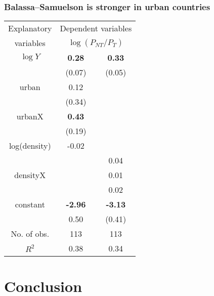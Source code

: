 \documentclass[handout,compress,mathserif]{beamer}
\newcounter{perc}
\newcounter{percek}
\begin{document}
\begin{frame}\frametitle{Balassa--Samuelson is stronger in urban countries}
\begin{tabular}{c|cc}
  \hline\hline
  Explanatory & \multicolumn{2}{c}{Dependent variables} \\
  variables & \multicolumn{2}{c}{$\log(P_{NT}/P_T)$} \\ \hline
  $\log Y$ &  \textbf{0.28}   & \textbf{0.33} \\
           &  (0.07)          & (0.05)        \\
  urban    & 0.12            &               \\
           & (0.34)          &               \\
  urbanX   &  \textbf{0.43}   &              \\
           &  (0.19)          &              \\
  log(density)                 & -0.02        \\
           &                 &  0.04        \\
  densityX &                   & 0.01         \\
           &                  & 0.02         \\
  constant &  \textbf{-2.96}  & \textbf{-3.13}\\
           & 0.50            & (0.41)        \\ \hline
  No. of obs. & 113             & 113          \\
  $R^2$    & 0.38            & 0.34  \\
  \hline\hline
\end{tabular}

\end{frame}

\section{Conclusion}
\begin{frame}\frametitle{}
\end{frame}
\end{document}
